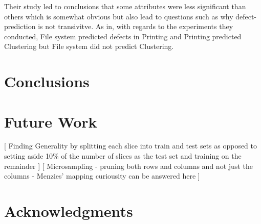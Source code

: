 \documentclass{sig-alternate}
\begin{document}
Their study led to conclusions that some attributes were less significant than others which is somewhat obvious but also lead to questions such as why defect-prediction is not transivitve. As in, with regards to the experiments they conducted, File system predicted defects in Printing and Printing predicted Clustering but File system did not predict Clustering. 
 
\section{Conclusions} 
 
 
\section{Future Work} 
[ Finding Generality by splitting each slice into train and test sets as opposed to setting aside 10\% of the number of slices as the test set and training on the remainder ]
[ Microsampling - pruning both rows and columns and not just the columns - Menzies' mapping curiousity can be answered here ]

\section{Acknowledgments}
 
% 
 
% 
% 
 
\end{document}
